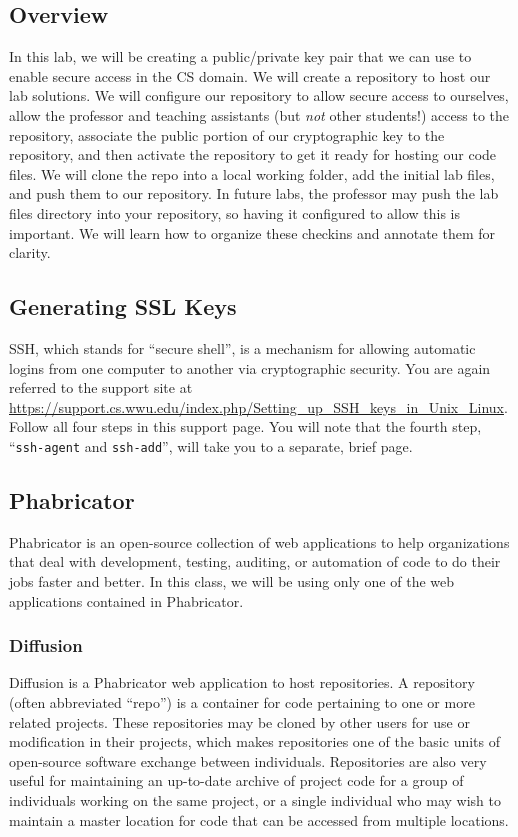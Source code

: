 \documentclass[12pt]{article}
\begin{document}
\subsection{Overview}
In this lab, we will be creating a public/private key pair that we can use to enable secure access in the CS domain.  We will create a repository to host our lab solutions.  We will configure our repository to allow secure access to ourselves, allow the professor and teaching assistants (but \textit{not} other students!) access to the repository, associate the public portion of our cryptographic key to the repository, and then activate the repository to get it ready for hosting our code files.  We will clone the repo into a local working folder, add the initial lab files, and push them to our repository.  In future labs, the professor may push the lab files directory into your repository, so having it configured to allow this is important.  We will learn how to organize these checkins and annotate them for clarity.

\subsection{Generating SSL Keys}
SSH, which stands for ``secure shell'', is a mechanism for allowing automatic logins from one computer to another via cryptographic security.  You are again referred to the support site at \url{https://support.cs.wwu.edu/index.php/Setting_up_SSH_keys_in_Unix_Linux}.  Follow all four steps in this support page.  You will note that the fourth step, ``\verb|ssh-agent| and \verb|ssh-add|'', will take you to a separate, brief page.

\subsection{Phabricator}
Phabricator is an open-source collection of web applications to help organizations that deal with development, testing, auditing, or automation of code to do their jobs faster and better.  In this class, we will be using only one of the web applications contained in Phabricator.

\subsubsection{Diffusion}
Diffusion is a Phabricator web application to host repositories.  A repository (often abbreviated ``repo'') is a container for code pertaining to one or more related projects.  These repositories may be cloned by other users for use or modification in their projects, which makes repositories one of the basic units of open-source software exchange between individuals.  Repositories are also very useful for maintaining an up-to-date archive of project code for a group of individuals working on the same project, or a single individual who may wish to maintain a master location for code that can be accessed from multiple locations.
\end{document}
